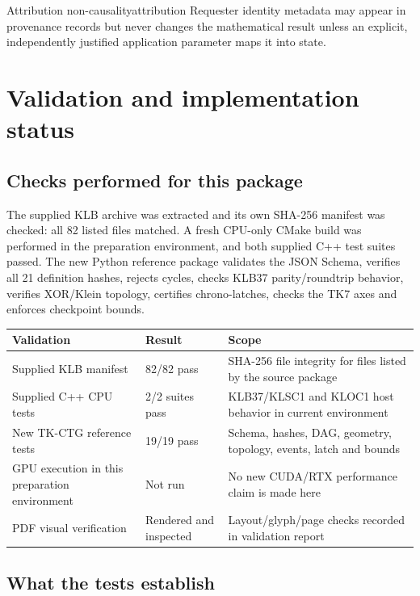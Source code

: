 \documentclass[10pt,a4paper]{article}
\begin{document}
\begin{invariant}{Attribution non-causality}{attribution}
Requester identity metadata may appear in provenance records but never changes the mathematical result unless an explicit, independently justified application parameter maps it into state.
\end{invariant}

\section{Validation and implementation status}
\label{sec:validation}

\subsection{Checks performed for this package}

The supplied KLB archive was extracted and its own SHA-256 manifest was checked: all 82 listed files matched. A fresh CPU-only CMake build was performed in the preparation environment, and both supplied C++ test suites passed. The new Python reference package validates the JSON Schema, verifies all 21 definition hashes, rejects cycles, checks KLB37 parity/roundtrip behavior, verifies XOR/Klein topology, certifies chrono-latches, checks the TK7 axes and enforces checkpoint bounds.

\begin{center}
\begin{tabularx}{0.94\textwidth}{@{}L{56mm}L{35mm}Y@{}}
\toprule
\textbf{Validation} & \textbf{Result} & \textbf{Scope} \\
\midrule
Supplied KLB manifest & 82/82 pass & SHA-256 file integrity for files listed by the source package \\
Supplied C++ CPU tests & 2/2 suites pass & KLB37/KLSC1 and KLOC1 host behavior in current environment \\
New TK-CTG reference tests & 19/19 pass & Schema, hashes, DAG, geometry, topology, events, latch and bounds \\
GPU execution in this preparation environment & Not run & No new CUDA/RTX performance claim is made here \\
PDF visual verification & Rendered and inspected & Layout/glyph/page checks recorded in validation report \\
\bottomrule
\end{tabularx}
\end{center}

\subsection{What the tests establish}
\end{document}
